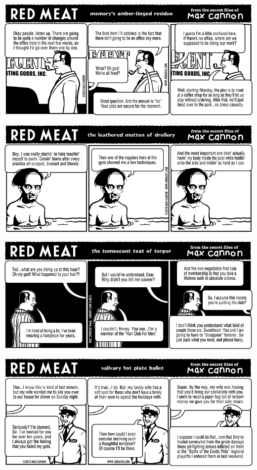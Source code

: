 \documentclass[a4paper,twoside,11pt]{article}
\begin{document}
\includegraphics[width=\textwidth]{redmeat_2010-05-04.png}



\includegraphics[width=\textwidth]{redmeat_2010-05-11.png}



\includegraphics[width=\textwidth]{redmeat_2010-05-18.png}



\includegraphics[width=\textwidth]{redmeat_2010-05-25.png}
\end{document}
